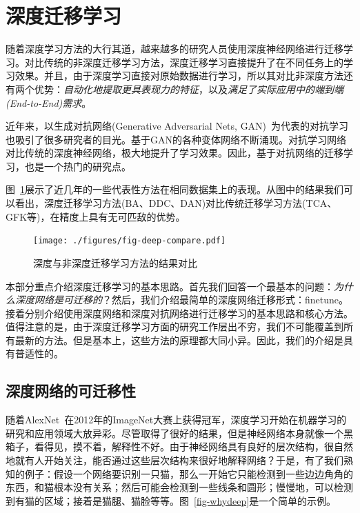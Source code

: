 \newpage
\section{深度迁移学习}

随着深度学习方法的大行其道，越来越多的研究人员使用深度神经网络进行迁移学习。对比传统的非深度迁移学习方法，深度迁移学习直接提升了在不同任务上的学习效果。并且，由于深度学习直接对原始数据进行学习，所以其对比非深度方法还有两个优势：\textit{自动化地提取更具表现力的特征}，以及\textit{满足了实际应用中的端到端(End-to-End)需求}。

近年来，以生成对抗网络(Generative Adversarial Nets, GAN)~\cite{goodfellow2014generative}为代表的对抗学习也吸引了很多研究者的目光。基于GAN的各种变体网络不断涌现。对抗学习网络对比传统的深度神经网络，极大地提升了学习效果。因此，基于对抗网络的迁移学习，也是一个热门的研究点。

图~\ref{fig-deep}展示了近几年的一些代表性方法在相同数据集上的表现。从图中的结果我们可以看出，深度迁移学习方法(BA、DDC、DAN)对比传统迁移学习方法(TCA、GFK等)，在精度上具有无可匹敌的优势。

\begin{figure}[htbp]
	\centering
	\texttt{[image: ./figures/fig-deep-compare.pdf]}
	\caption{深度与非深度迁移学习方法的结果对比}
	\label{fig-deep}
\end{figure}

本部分重点介绍深度迁移学习的基本思路。首先我们回答一个最基本的问题：\textit{为什么深度网络是可迁移的}？然后，我们介绍最简单的深度网络迁移形式：finetune。接着分别介绍使用深度网络和深度对抗网络进行迁移学习的基本思路和核心方法。值得注意的是，由于深度迁移学习方面的研究工作层出不穷，我们不可能覆盖到所有最新的方法。但是基本上，这些方法的原理都大同小异。因此，我们的介绍是具有普适性的。

\subsection{深度网络的可迁移性}
随着AlexNet~\cite{krizhevsky2012imagenet}在2012年的ImageNet大赛上获得冠军，深度学习开始在机器学习的研究和应用领域大放异彩。尽管取得了很好的结果，但是神经网络本身就像一个黑箱子，看得见，摸不着，解释性不好。由于神经网络具有良好的层次结构，很自然地就有人开始关注，能否通过这些层次结构来很好地解释网络？于是，有了我们熟知的例子：假设一个网络要识别一只猫，那么一开始它只能检测到一些边边角角的东西，和猫根本没有关系；然后可能会检测到一些线条和圆形；慢慢地，可以检测到有猫的区域；接着是猫腿、猫脸等等。图~\ref{fig-whydeep}是一个简单的示例。

